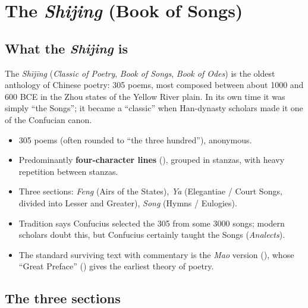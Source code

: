 \chapter{The \emph{Shijing} (Book of Songs)}

\section{What the \emph{Shijing} is}

The  \emph{Shījīng} (\emph{Classic of Poetry}, \emph{Book of Songs}, \emph{Book of
Odes}) is the oldest anthology of Chinese poetry: 305 poems, most composed between about
1000 and 600 BCE in the Zhou states of the Yellow River plain. In its own time it was simply
 ``the Songs''; it became a  ``classic'' when Han-dynasty scholars made it one
of the Confucian canon.

\begin{important}
\begin{itemize}
  \item 305 poems (often rounded to ``the three hundred''), anonymous.
  \item Predominantly \textbf{four-character lines} (), grouped in stanzas, with
        heavy repetition between stanzas.
  \item Three sections: \emph{Feng}  (Airs of the States), \emph{Ya} 
        (Elegantiae / Court Songs, divided into Lesser and Greater), \emph{Song} 
        (Hymns / Eulogies).
  \item Tradition says Confucius selected the 305 from some 3000 songs; modern scholars
        doubt this, but Confucius certainly taught the Songs (\emph{Analects}).
  \item The standard surviving text with commentary is the \emph{Mao} version
        (), whose ``Great Preface'' () gives the earliest theory of
        poetry.
\end{itemize}
\end{important}

\section{The three sections}

